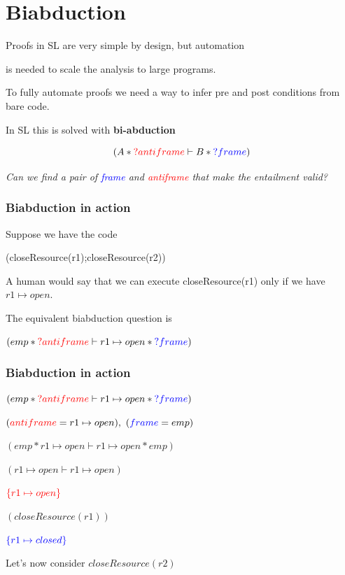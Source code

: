 \documentclass{beamer}
\begin{document}
    \section{Biabduction}
    \begin{frame}
        Proofs in SL are very simple by design, but automation

        is needed to scale the analysis to large programs. 
        
        To fully automate proofs we need a way to infer pre and post conditions from bare code.
        
        
        \bigskip
        In SL this is solved with \textbf{bi-abduction}
        \pause
        \begin{card} 
            $$
            (A \ast \textcolor{red}{?antiframe} \vdash B \ast \textcolor{blue}{?frame})
            $$
        \end{card}
        \bigskip
        \emph{Can we find a pair of \textcolor{blue}{frame} and \textcolor{red}{antiframe} that make the entailment valid?}
    \end{frame}
    \begin{frame}
        \frametitle{Biabduction in action}

        Suppose we have the code
        \begin{center}
            (closeResource(r1);closeResource(r2))
        \end{center}
        A human would say that we can execute closeResource(r1) only if we have
        $r1 \mapsto open$.

        The equivalent biabduction question is
        \begin{card}
            $(emp \ast \textcolor{red}{?antiframe} \vdash r1 \mapsto open \ast \textcolor{blue}{?frame})$
        \end{card}
    \end{frame}
    \begin{frame}
        \frametitle{Biabduction in action}
        $(emp \ast \textcolor{red}{?antiframe} \vdash r1 \mapsto open \ast \textcolor{blue}{?frame})$
        \small
        
        \bigskip
        \pause
        $(\textcolor{red}{antiframe} = r1 \mapsto open),\ (\textcolor{blue}{frame}=emp)$

        \bigskip
        \pause
        $ (emp \ast r1 \mapsto open \vdash r1 \mapsto open \ast emp)$

        $ ( r1 \mapsto open \vdash r1 \mapsto open)$

        \bigskip
        \pause
        $\textcolor{red}{\{r1 \mapsto open\}}$
        
        $(closeResource(r1))$
        
        $\textcolor{blue}{\{r1 \mapsto closed\}}$

        \bigskip
        \pause
        \normalsize
        Let's now consider $closeResource(r2)$

    \end{frame}
\end{document}
